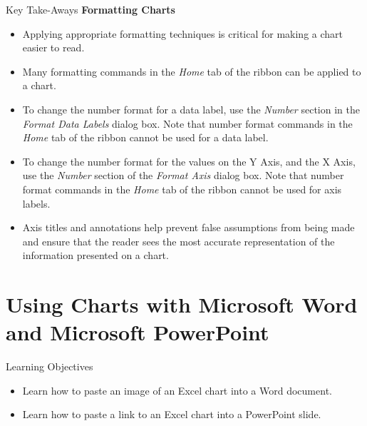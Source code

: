 \begin{center}
	\begin{tkwbox}{Key Take-Aways}
		\textbf{Formatting Charts}
		\\
		\begin{itemize}
			\setlength{\itemsep}{0pt}
			\setlength{\parskip}{0pt}
			\setlength{\parsep}{0pt}

			\item Applying appropriate formatting techniques is critical for making a chart easier to read.
			\item Many formatting commands in the \textit{Home} tab of the ribbon can be applied to a chart.
			\item To change the number format for a data label, use the \textit{Number} section in the \textit{Format Data Labels} dialog box. Note that number format commands in the \textit{Home} tab of the ribbon cannot be used for a data label.
			\item To change the number format for the values on the Y Axis, and the X Axis, use the \textit{Number} section of the \textit{Format Axis} dialog box. Note that number format commands in the \textit{Home} tab of the ribbon cannot be used for axis labels.
			\item Axis titles and annotations help prevent false assumptions from being made and ensure that the reader sees the most accurate representation of the information presented on a chart.
			
		\end{itemize}
	\end{tkwbox}
\end{center}

\section{Using Charts with Microsoft Word and Microsoft PowerPoint}

\begin{center}
	\begin{objbox}{Learning Objectives}
		\begin{itemize}
			\setlength{\itemsep}{0pt}
			\setlength{\parskip}{0pt}
			\setlength{\parsep}{0pt}

			\item Learn how to paste an image of an Excel chart into a Word document.
			\item Learn how to paste a link to an Excel chart into a PowerPoint slide.
			
		\end{itemize}
	\end{objbox}
\end{center}

